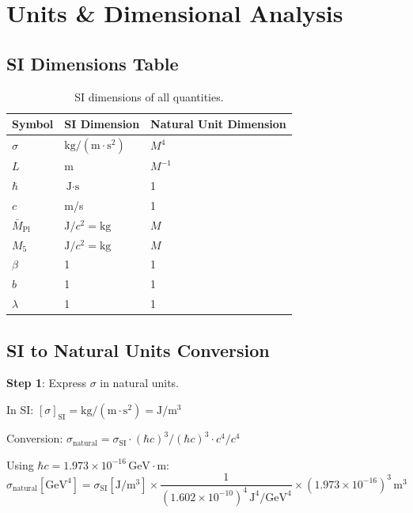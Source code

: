 \documentclass[11pt,a4paper]{article}
\newcommand{\Mpl}{\bar{M}_{\mathrm{Pl}}}
\newcommand{\Mfive}{M_5}
\theoremstyle{definition}
\theoremstyle{plain}
\theoremstyle{remark}
\begin{document}
\appendix

\section{Units \& Dimensional Analysis}
\label{sec:units-appendix}

\subsection{SI Dimensions Table}

\begin{table}[htbp]
\centering
\caption{SI dimensions of all quantities.}
\label{tab:SI-dimensions}
\begin{tabular}{@{}lll@{}}
\toprule
Symbol & SI Dimension & Natural Unit Dimension \\
\midrule
$\sigma$ & $\text{kg}/(\text{m}\cdot\text{s}^2)$ & $M^4$ \\
$L$ & m & $M^{-1}$ \\
$\hbar$ & $\text{J}\cdot\text{s}$ & 1 \\
$c$ & m/s & 1 \\
$\Mpl$ & $\text{J}/c^2 = \text{kg}$ & $M$ \\
$\Mfive$ & $\text{J}/c^2 = \text{kg}$ & $M$ \\
$\beta$ & 1 & 1 \\
$b$ & 1 & 1 \\
$\lambda$ & 1 & 1 \\
\bottomrule
\end{tabular}
\end{table}

\subsection{SI to Natural Units Conversion}

\textbf{Step 1}: Express $\sigma$ in natural units.

In SI: $[\sigma]_{\text{SI}} = \text{kg}/(\text{m}\cdot\text{s}^2) = \text{J}/\text{m}^3$

Conversion: $\sigma_{\text{natural}} = \sigma_{\text{SI}} \cdot (\hbar c)^3 / (\hbar c)^3 \cdot c^4/c^4$

Using $\hbar c = 1.973 \times 10^{-16}\,\text{GeV}\cdot\text{m}$:
\begin{equation}
\sigma_{\text{natural}}[\text{GeV}^4] = \sigma_{\text{SI}}[\text{J}/\text{m}^3] \times
\frac{1}{(1.602 \times 10^{-10})^4\,\text{J}^4/\text{GeV}^4} \times (1.973 \times 10^{-16})^3\,\text{m}^3
\label{eq:sigma-conversion-full}
\end{equation}
\end{document}
